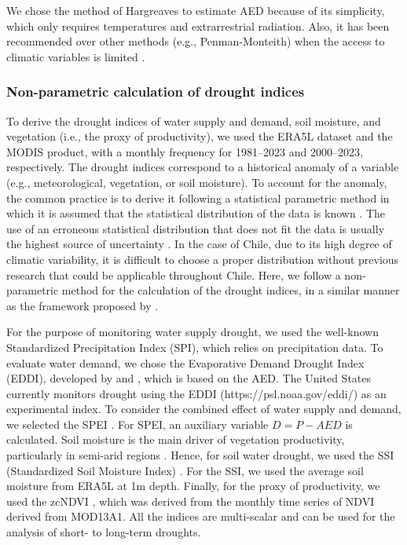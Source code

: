 \documentclass[
  authoryear,
  preprint,
  3p,
  onecolumn]{elsarticle}
\begin{document}
We chose the method of Hargreaves to estimate AED because of its
simplicity, which only requires temperatures and extrarrestrial
radiation. Also, it has been recommended over other methods (e.g.,
Penman-Monteith) when the access to climatic variables is limited
\citep{Vicente-Serrano2014}.

\subsubsection{Non-parametric calculation of drought
indices}\label{non-parametric-calculation-of-drought-indices}

To derive the drought indices of water supply and demand, soil moisture,
and vegetation (i.e., the proxy of productivity), we used the ERA5L
dataset and the MODIS product, with a monthly frequency for 1981--2023
and 2000--2023, respectively. The drought indices correspond to a
historical anomaly of a variable (e.g., meteorological, vegetation, or
soil moisture). To account for the anomaly, the common practice is to
derive it following a statistical parametric method in which it is
assumed that the statistical distribution of the data is known
\citep{Heim2002}. The use of an erroneous statistical distribution that
does not fit the data is usually the highest source of uncertainty
\citep{Laimighofer2022}. In the case of Chile, due to its high degree of
climatic variability, it is difficult to choose a proper distribution
without previous research that could be applicable throughout Chile.
Here, we follow a non-parametric method for the calculation of the
drought indices, in a similar manner as the framework proposed by
\citet{Farahmand2015}.

For the purpose of monitoring water supply drought, we used the
well-known Standardized Precipitation Index (SPI), which relies on
precipitation data. To evaluate water demand, we chose the Evaporative
Demand Drought Index (EDDI), developed by \citet{Hobbins2016} and
\citet{McEvoy2016}, which is based on the AED. The United States
currently monitors drought using the EDDI (https://psl.noaa.gov/eddi/)
as an experimental index. To consider the combined effect of water
supply and demand, we selected the SPEI \citep{Vicente-Serrano2010}. For
SPEI, an auxiliary variable \(D=P-AED\) is calculated. Soil moisture is
the main driver of vegetation productivity, particularly in semi-arid
regions \citep{Li2022}. Hence, for soil water drought, we used the SSI
(Standardized Soil Moisture Index) \citep{Hao2013}. For the SSI, we used
the average soil moisture from ERA5L at 1m depth. Finally, for the proxy
of productivity, we used the zcNDVI \citep{Zambrano2018}, which was
derived from the monthly time series of NDVI derived from MOD13A1. All
the indices are multi-scalar and can be used for the analysis of short-
to long-term droughts.
\end{document}
